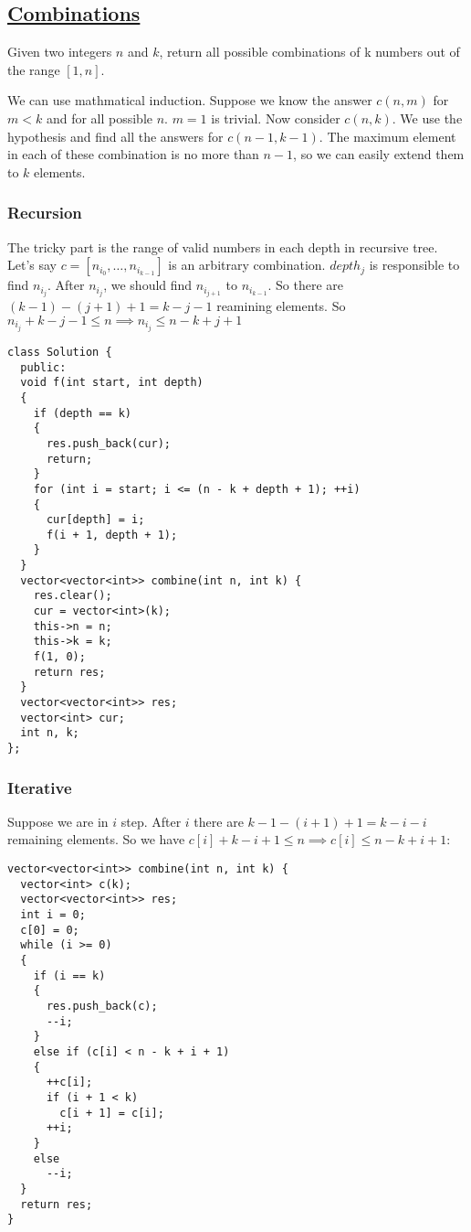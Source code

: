 \documentclass{book}
\begin{document}
	\subsection{\href{https://leetcode.com/problems/combinations/}{Combinations}}
	Given two integers $n$ and $k$, return all possible combinations of k numbers out of the range $[1, n]$.
	\par We can use mathmatical induction. Suppose we know the answer $c(n, m)$ for $m < k$ and for all possible $n$. $m = 1$ is trivial. Now consider $c(n, k)$. We use the hypothesis and find all the answers for $c(n - 1, k - 1)$. The maximum element in each of these combination is no more than $n - 1$, so we can easily extend them to $k$ elements.
	\subsubsection{Recursion}
	The tricky part is the range of valid numbers in each depth in recursive tree. Let's say $c = [n_{i_0}, \dots, n_{i_{k -1}}]$ is an arbitrary combination. $depth_j$ is responsible to find $n_{i_j}$. After $n_{i_j}$, we should find $n_{i_{j + 1}}$ to $n_{i_{k - 1}}$. So there are $(k - 1) - (j + 1) + 1 = k - j - 1$ reamining elements. So $n_{i_j} + k - j - 1 \le n \implies n_{i_j} \le n - k + j + 1$
	\begin{lstlisting}
class Solution {
  public:
  void f(int start, int depth)
  {
    if (depth == k)
    {
      res.push_back(cur);
      return;
    }
    for (int i = start; i <= (n - k + depth + 1); ++i)
    {
      cur[depth] = i;
      f(i + 1, depth + 1);
    }
  }
  vector<vector<int>> combine(int n, int k) {
    res.clear();
    cur = vector<int>(k);
    this->n = n;
    this->k = k;
    f(1, 0);
    return res;
  }
  vector<vector<int>> res;
  vector<int> cur;
  int n, k;
};
	\end{lstlisting}
	\subsubsection{Iterative}
	Suppose we are in $i$ step. After $i$ there are $k - 1 - (i + 1) + 1 = k - i - i$ remaining elements. So we have $c[i] + k - i + 1 \le n \implies c[i] \le n - k + i + 1$:
	\begin{lstlisting}
vector<vector<int>> combine(int n, int k) {
  vector<int> c(k);
  vector<vector<int>> res;
  int i = 0;
  c[0] = 0;
  while (i >= 0)
  {
    if (i == k)
    {
      res.push_back(c);
      --i;
    }
    else if (c[i] < n - k + i + 1)
    {
      ++c[i];
      if (i + 1 < k)
        c[i + 1] = c[i];
      ++i;
    }
    else
      --i;
  }
  return res;
} 
	\end{lstlisting}
\end{document}
